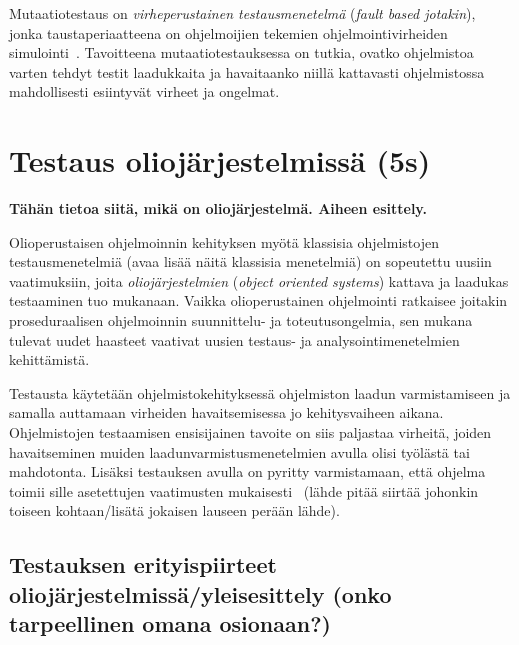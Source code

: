 \documentclass[finnish, grading]{tktltiki2}
\theoremstyle{definition}
\theoremstyle{remark}
\begin{document}
%

Mutaatiotestaus on \textit{virheperustainen testausmenetelmä} (\textit{fault based jotakin}), jonka taustaperiaatteena on ohjelmoijien tekemien ohjelmointivirheiden simulointi~\cite[s. 649]{Jia:Harman:2011}. Tavoitteena mutaatiotestauksessa on tutkia, ovatko ohjelmistoa varten tehdyt testit laadukkaita ja havaitaanko niillä kattavasti ohjelmistossa mahdollisesti esiintyvät virheet ja ongelmat. 


\section{Testaus oliojärjestelmissä (5s)}

\textbf{Tähän tietoa siitä, mikä on oliojärjestelmä. Aiheen esittely.}

Olioperustaisen ohjelmoinnin kehityksen myötä klassisia ohjelmistojen testausmenetelmiä (avaa lisää näitä klassisia menetelmiä) on sopeutettu uusiin vaatimuksiin, joita \textit{oliojärjestelmien} (\textit{object oriented systems}) kattava ja laadukas testaaminen tuo mukanaan. Vaikka olioperustainen ohjelmointi ratkaisee joitakin proseduraalisen ohjelmoinnin suunnittelu- ja toteutusongelmia, sen mukana tulevat uudet haasteet vaativat uusien testaus- ja analysointimenetelmien kehittämistä. 

Testausta käytetään ohjelmistokehityksessä ohjelmiston laadun varmistamiseen ja samalla auttamaan virheiden havaitsemisessa jo kehitysvaiheen aikana. Ohjelmistojen testaamisen ensisijainen tavoite on siis paljastaa virheitä, joiden havaitseminen muiden laadunvarmistusmenetelmien avulla olisi työlästä tai mahdotonta. Lisäksi testauksen avulla on pyritty varmistamaan, että ohjelma toimii sille asetettujen vaatimusten mukaisesti~\cite[s. 59]{Binder:1999} (lähde pitää siirtää johonkin toiseen kohtaan/lisätä jokaisen lauseen perään lähde). 

\subsection{Testauksen erityispiirteet oliojärjestelmissä/yleisesittely (onko tarpeellinen omana osionaan?)}
\end{document}
